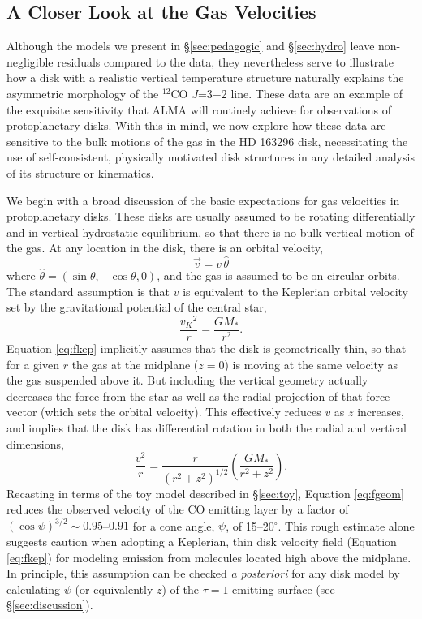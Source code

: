 \subsection{A Closer Look at the Gas Velocities}
\label{sec:velocity}
Although the models we present in \S\ref{sec:pedagogic} and \S\ref{sec:hydro} 
leave non-negligible residuals compared to the data, they nevertheless serve to 
illustrate how a disk with a realistic vertical temperature structure naturally 
explains the asymmetric morphology of the $^{12}$CO $J$=3$-$2 line.  These data 
are an example of the exquisite sensitivity that ALMA will routinely achieve for
observations of protoplanetary disks.  With this in mind, we now explore how 
these data are sensitive to the bulk motions of the gas in the HD 163296 disk, 
necessitating the use of self-consistent, physically motivated disk structures 
in any detailed analysis of its structure or kinematics.

We begin with a broad discussion of the basic expectations for gas velocities in
protoplanetary disks.  These disks are usually assumed to be rotating 
differentially and in vertical hydrostatic equilibrium, so that there is no bulk
vertical motion of the gas.  At any location in the disk, there is an orbital 
velocity,
\begin{equation}
\vec{v} = v \,\hat{\theta}
\end{equation}
where $\hat{\theta}=(\sin\theta, -\cos\theta,0)$, and the gas is assumed to be 
on circular orbits.  The standard \citep[or tested, e.g.][]{dutrey94} assumption
is that $v$ is equivalent to the Keplerian orbital velocity set by the 
gravitational potential of the central star,
\begin{equation}
\frac{{v_K}^2}{r} = \frac{G M_\ast}{r^2}.
\label{eq:fkep}
\end{equation}
Equation \ref{eq:fkep} implicitly assumes that the disk is geometrically thin, 
so that for a given $r$ the gas at the midplane ($z=0$) is moving at the same 
velocity as the gas suspended above it.  But including the vertical geometry 
actually decreases the force from the star as well as the radial projection of 
that force vector (which sets the orbital velocity).  This effectively reduces 
$v$ as $z$ increases, and implies that the disk has differential rotation in 
both the radial and vertical dimensions,
\begin{equation}
\frac{v^2}{r} = \frac{r}{(r^2 + z^2)^{1/2}} \left(\frac{G M_\ast}{r^2 + z^2}\right).
\label{eq:fgeom}
\end{equation}
Recasting in terms of the toy model described in \S\ref{sec:toy}, Equation
\ref{eq:fgeom} reduces the observed velocity of the CO emitting layer by a 
factor of $(\cos\psi)^{3/2} \sim 0.95$--$0.91$ for a cone angle, $\psi$, of 
15--20$^{\circ}$.  This rough estimate alone suggests caution when adopting a 
Keplerian, thin disk velocity field (Equation \ref{eq:fkep}) for modeling 
emission from molecules located high above the midplane.  In principle, this
assumption can be checked {\it a posteriori} for any disk model by calculating 
$\psi$ (or equivalently $z$) of the $\tau=1$ emitting surface 
(see \S\ref{sec:discussion}).

